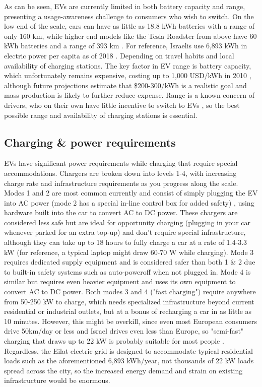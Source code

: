 \documentclass{report}                         %
\begin{document}
As can be seen, EVs are currently limited in both battery capacity and range, presenting a usage-awareness challenge to consumers who wish to switch. On the low end of the scale, cars can have as little as 18.8 kWh batteries with a range of only 160 km, while higher end models like the Tesla Roadster from above have 60 kWh batteries and a range of 393 km \cite{20182018Information}. For reference, Israelis use 6,893 kWh in electric power per capita as of 2018 \cite{2018Key2018}. Depending on travel habits and local availability of charging stations. The key factor in EV range is battery capacity, which unfortunately remains expensive, costing up to 1,000 USD/kWh in 2010 \cite{Mock2010MarketVehicles}, although future projections estimate that \$200-300/kWh is a realistic goal and mass production is likely to further reduce expense. Range is a known concern of drivers, who on their own have little incentive to switch to EVs \cite{Mock2010MarketVehicles}, so the best possible range and availability of charging stations is essential.

\subsection{Charging \& power requirements}
EVs have significant power requirements while charging that require special accommodations. Chargers are broken down into levels 1-4, with increasing charge rate and infrastructure requirements as you progress along the scale. Modes 1 and 2 are most common currently and consist of simply plugging the EV into AC power (mode 2 has a special in-line control box for added safety) \cite{Bossche2010ElectricInfrastructure}, using hardware built into the car to convert AC to DC power. These chargers are considered less safe but are ideal for opportunity charging (plugging in your car whenever parked for an extra top-up) and don't require special infrastructure, although they can take up to 18 hours to fully charge a car at a rate of 1.4-3.3 kW \cite{Ustun2015ImpactSystems} (for reference, a typical laptop might draw 60-70 W while charging). Mode 3 requires dedicated supply equipment and is considered safer than both 1 \& 2 due to built-in safety systems such as auto-poweroff when not plugged in. Mode 4 is similar but requires even heavier equipment and uses its own equipment to convert AC to DC power. Both modes 3 and 4 ("fast charging") require anywhere from 50-250 kW \cite{Ustun2015ImpactSystems, Bossche2010ElectricInfrastructure} to charge, which needs specialized infrastructure beyond current residential or industrial outlets, but at a bonus of recharging a car in as little as 10 minutes. However, this might be overkill, since even most European consumers drive 50km/day or less and Israel drives even less than Europe, so "semi-fast" charging that draws up to 22 kW is probably suitable for most people \cite{Bossche2010ElectricInfrastructure}. Regardless, the Eilat electric grid is designed to accommodate typical residential loads such as the aforementioned 6,893 kWh/year, not thousands of 22 kW loads spread across the city, so the increased energy demand and strain on existing infrastructure would be enormous.
\end{document}
